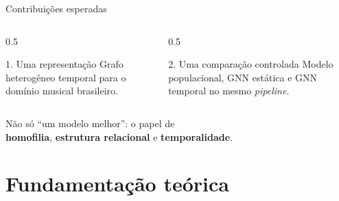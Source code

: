 \documentclass[aspectratio=169]{beamer}
\newcommand{\azul}[1]{\textcolor{ufprA}{\textbf{#1}}}
\begin{document}
\begin{frame}{Contribuições esperadas}
  \vfill
  \begin{columns}[T]
  \begin{column}{0.5\textwidth}
    \begin{block}{1. Uma representação}
      Grafo heterogêneo temporal para o domínio musical brasileiro.
    \end{block}
  \end{column}
  \begin{column}{0.5\textwidth}
    \begin{block}{2. Uma comparação controlada}
      Modelo populacional, GNN estática e GNN temporal no mesmo \emph{pipeline}.
    \end{block}
  \end{column}
  \end{columns}
  \vfill
  \begin{center}
    Não só ``um modelo melhor'': o papel de\\
    \azul{homofilia}, \azul{estrutura relacional} e \azul{temporalidade}.
  \end{center}
  \vfill
\end{frame}

\section{Fundamentação teórica}
\end{document}
